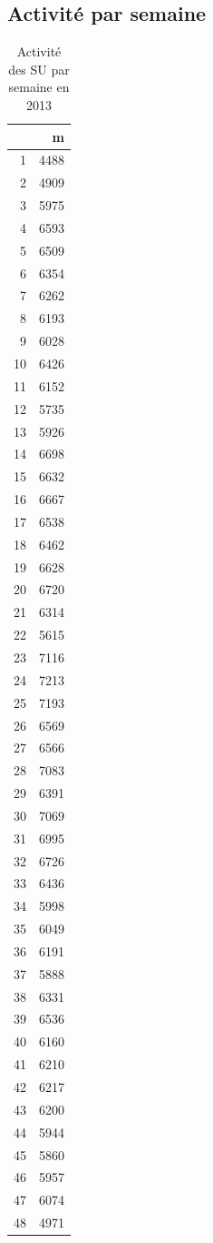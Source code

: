 \documentclass[12pt,english,french,twoside]{report}\usepackage[]{graphicx}\usepackage[]{color}
\begin{document}
\subsection*{Activité par semaine}

\begin{table}[ht]
\centering
\begin{tabular}{rr}
  \hline
 & m \\ 
  \hline
1 & 4488 \\ 
  2 & 4909 \\ 
  3 & 5975 \\ 
  4 & 6593 \\ 
  5 & 6509 \\ 
  6 & 6354 \\ 
  7 & 6262 \\ 
  8 & 6193 \\ 
  9 & 6028 \\ 
  10 & 6426 \\ 
  11 & 6152 \\ 
  12 & 5735 \\ 
  13 & 5926 \\ 
  14 & 6698 \\ 
  15 & 6632 \\ 
  16 & 6667 \\ 
  17 & 6538 \\ 
  18 & 6462 \\ 
  19 & 6628 \\ 
  20 & 6720 \\ 
  21 & 6314 \\ 
  22 & 5615 \\ 
  23 & 7116 \\ 
  24 & 7213 \\ 
  25 & 7193 \\ 
  26 & 6569 \\ 
  27 & 6566 \\ 
  28 & 7083 \\ 
  29 & 6391 \\ 
  30 & 7069 \\ 
  31 & 6995 \\ 
  32 & 6726 \\ 
  33 & 6436 \\ 
  34 & 5998 \\ 
  35 & 6049 \\ 
  36 & 6191 \\ 
  37 & 5888 \\ 
  38 & 6331 \\ 
  39 & 6536 \\ 
  40 & 6160 \\ 
  41 & 6210 \\ 
  42 & 6217 \\ 
  43 & 6200 \\ 
  44 & 5944 \\ 
  45 & 5860 \\ 
  46 & 5957 \\ 
  47 & 6074 \\ 
  48 & 4971 \\ 
   \hline
\end{tabular}
\caption[Activité par semaine]{Activité des SU par semaine en 2013} 
\label{act_sem}
\end{table}
\end{document}
